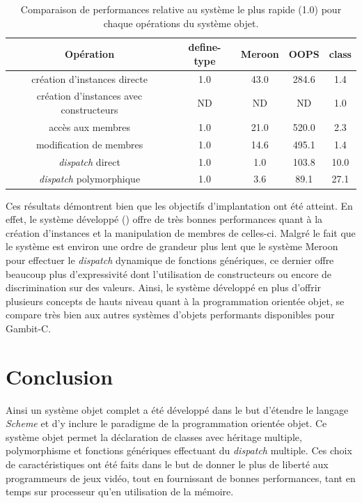 \documentclass[12pt,twoside,letterpaper,francais]{book}
\newcommand{\Schemelang}{{\textit{Scheme }}}
\newcommand{\scheme}[1]{\selectlanguage{english}{\tt #1}\selectlanguage{french}}
\begin{document}
\begin{table}
  \center
  \begin{tabular}{ccccc}
    \hline
    Opération & define-type & Meroon & OOPS & class \\
    \hline \hline
    création d'instances directe & 1.0 & 43.0 & 284.6 & 1.4 \\
    création d'instances avec constructeurs & ND & ND & ND & 1.0 \\
    accès aux membres & 1.0 & 21.0 & 520.0 & 2.3 \\
    modification de membres & 1.0 & 14.6 & 495.1 & 1.4 \\
    \textit{dispatch} direct & 1.0 & 1.0 & 103.8 & 10.0 \\
    \textit{dispatch} polymorphique & 1.0 & 3.6 & 89.1 & 27.1 \\
    \hline
  \end{tabular}
  \caption{Comparaison de performances relative au système le plus
    rapide (1.0) pour chaque opérations du système objet.}
  \label{OO:bench-rel}
\end{table}

Ces résultats démontrent bien que les objectifs d'implantation ont été
atteint. En effet, le système développé (\scheme{class}) offre de très
bonnes performances quant à la création d'instances et la manipulation
de membres de celles-ci. Malgré le fait que le système est environ une
ordre de grandeur plus lent que le système Meroon pour effectuer le
\textit{dispatch} dynamique de fonctions génériques, ce dernier offre
beaucoup plus d'expressivité dont l'utilisation de constructeurs ou
encore de discrimination sur des valeurs. Ainsi, le système développé
en plus d'offrir plusieurs concepts de hauts niveau quant à la
programmation orientée objet, se compare très bien aux autres systèmes
d'objets performants disponibles pour Gambit-C.

\FloatBarrier
\section{Conclusion}
Ainsi un système objet complet a été développé dans le but d'étendre
le langage \Schemelang et d'y inclure le paradigme de la programmation
orientée objet. Ce système objet permet la déclaration de classes avec
héritage multiple, polymorphisme et fonctions génériques effectuant du
\textit{dispatch} multiple. Ces choix de caractéristiques ont été
faits dans le but de donner le plus de liberté aux programmeurs de
jeux vidéo, tout en fournissant de bonnes performances, tant en temps
sur processeur qu'en utilisation de la mémoire.
\end{document}
